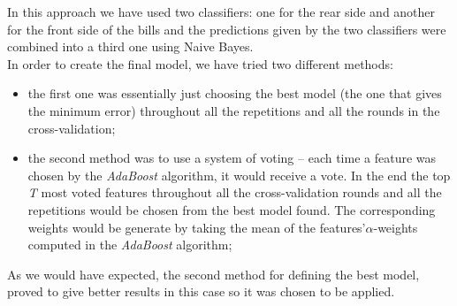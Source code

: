 \documentclass[11pt,twocolumn]{article}
\begin{document}
 		\hspace*{10px}In this approach we have used two classifiers: one for the rear side and another for the front side of the bills and the predictions given by the two classifiers were combined into a third one using Naive Bayes.\\
		\hspace*{10px}In order to create the final model, we have tried two different methods: 
\begin{itemize}
\item the first one was essentially just choosing the best model (the one that gives the minimum error) throughout all the repetitions and all the rounds in the cross-validation;
\item the second method was to use a system of voting -- each time a feature was chosen by the \emph{AdaBoost} algorithm, it would receive a vote. In the end the top \emph{T} most voted features throughout all the cross-validation rounds and all the repetitions would be chosen from the best model found. The corresponding weights would be generate by taking the mean of the features\rq\@ $\alpha$-weights computed in the \emph{AdaBoost} algorithm;     
\end{itemize}
As we would have expected, the second method for defining the best model, proved to give better results in this case so it was chosen to be applied.\\
\end{document}
